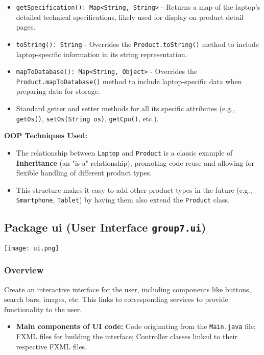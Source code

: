 \documentclass{article}
\begin{document}
\begin{itemize}
\begin{itemize}
        \item \texttt{getSpecification(): Map<String, String>} - Returns a map of the laptop's detailed technical specifications, likely used for display on product detail pages.
        \item \texttt{toString(): String} - Overrides the \texttt{Product.toString()} method to include laptop-specific information in its string representation.
        \item \texttt{mapToDatabase(): Map<String, Object>} - Overrides the \texttt{Product.mapToDatabase()} method to include laptop-specific data when preparing data for storage.
        \item Standard getter and setter methods for all its specific attributes (e.g., \texttt{getOs()}, \texttt{setOs(String os)}, \texttt{getCpu()}, etc.).
    \end{itemize}
\end{itemize}
\textbf{OOP Techniques Used:}
\begin{itemize}
    \item The relationship between \texttt{Laptop} and \texttt{Product} is a classic example of \textbf{Inheritance} (an "is-a" relationship), promoting code reuse and allowing for flexible handling of different product types.
    \item This structure makes it easy to add other product types in the future (e.g., \texttt{Smartphone}, \texttt{Tablet}) by having them also extend the \texttt{Product} class.
\end{itemize}

\subsection{Package ui (User Interface \texttt{group7.ui})}

\texttt{[image: ui.png]} %

\subsubsection{Overview}
Create an interactive interface for the user, including components like buttons, search bars, images, etc. This links to corresponding services to provide functionality to the user.
\begin{itemize}
    \item \textbf{Main components of UI code:} Code originating from the \texttt{Main.java} file; FXML files for building the interface; Controller classes linked to their respective FXML files.
\end{itemize}
\end{document}
